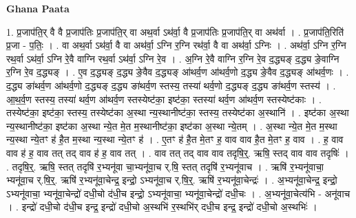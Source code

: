 \documentclass[17pt]{extarticle}
\begin{document}
\textbf{Ghana Paata } \newline

1. प्र॒जाप॑ति॒र् वै वै प्र॒जाप॑तिः प्र॒जाप॑ति॒र् वा अथ॒र्वा ऽथ॑र्वा॒ वै प्र॒जाप॑तिः प्र॒जाप॑ति॒र् वा अथ॑र्वा । . प्र॒जाप॑ति॒रिति॑ प्र॒जा - प॒तिः॒ । . वा अथ॒र्वा ऽथ॑र्वा॒ वै वा अथ॑र्वा॒ ऽग्नि र॒ग्नि रथ॑र्वा॒ वै वा अथ॑र्वा॒ ऽग्निः । . अथ॑र्वा॒ ऽग्नि र॒ग्नि रथ॒र्वा ऽथ॑र्वा॒ ऽग्नि रे॒वै वाग्नि रथ॒र्वा ऽथ॑र्वा॒ ऽग्नि रे॒व । . अ॒ग्नि रे॒वै वाग्नि र॒ग्नि रे॒व द॒द्ध्यङ् द॒द्ध्य ङे॒वाग्नि र॒ग्नि रे॒व द॒द्ध्यङ् । . ए॒व द॒द्ध्यङ् द॒द्ध्य ङे॒वैव द॒द्ध्यङ् आ॑थर्व॒ण आ॑थर्व॒णो द॒द्ध्य ङे॒वैव द॒द्ध्यङ् आ॑थर्व॒णः । . द॒द्ध्य ङा॑थर्व॒ण आ॑थर्व॒णो द॒द्ध्यङ् द॒द्ध्य ङा॑थर्व॒ण स्तस्य॒ तस्या॑ थर्व॒णो 
द॒द्ध्यङ् द॒द्ध्य ङा॑थर्व॒ण स्तस्य॑ । . आ॒थ॒र्व॒ण स्तस्य॒ तस्या॑ थर्व॒ण आ॑थर्व॒ण स्तस्येष्ट॑का॒ इष्ट॑का॒ स्तस्या॑ थर्व॒ण आ॑थर्व॒ण 
स्तस्येष्ट॑काः । . तस्येष्ट॑का॒ इष्ट॑का॒ स्तस्य॒ तस्येष्ट॑का अ॒स्था न्य॒स्थानीष्ट॑का॒ स्तस्य॒ तस्येष्ट॑का अ॒स्थानि॑ । . इष्ट॑का अ॒स्था न्य॒स्थानीष्ट॑का॒ इष्ट॑का अ॒स्था न्ये॒त मे॒त म॒स्थानीष्ट॑का॒ इष्ट॑का अ॒स्था न्ये॒तम् । . अ॒स्था न्ये॒त मे॒त म॒स्था न्य॒स्था न्ये॒तꣳ ह॑ है॒त म॒स्था न्य॒स्था न्ये॒तꣳ ह॑ । . ए॒तꣳ ह॑ है॒त मे॒तꣳ ह॒ वाव वाव है॒त मे॒तꣳ ह॒ वाव । . ह॒ वाव वाव ह॑ ह॒ वाव तत् तद् वाव ह॑ ह॒ वाव तत् । . वाव तत् तद् वाव वाव तदृषि॒र्॒. ऋषि॒ स्तद् वाव वाव तदृषिः॑ । . तदृषि॒र्॒. ऋषि॒ स्तत् तदृषि॑ र॒भ्यनू॑वा चा॒भ्यनू॑वा॒च र्.षि॒ स्तत् तदृषि॑ र॒भ्यनू॑वाच । . ऋषि॑ र॒भ्यनू॑वाचा॒ भ्यनू॑वा॒च र्.षि॒र्॒. ऋषि॑ र॒भ्यनू॑वा॒चेन्द्र॒ इन्द्रो॒ ऽभ्यनू॑वा॒च र्.षि॒र्॒. ऋषि॑ र॒भ्यनू॑वा॒चेन्द्रः॑ । . अ॒भ्यनू॑वा॒चेन्द्र॒ इन्द्रो॒ ऽभ्यनू॑वाचा॒ भ्यनू॑वा॒चेन्द्रो॑ दधी॒चो द॑धी॒च इन्द्रो॒ ऽभ्यनू॑वाचा॒ 
भ्यनू॑वा॒चेन्द्रो॑ दधी॒चः । . अ॒भ्यनू॑वा॒चेत्य॑भि - अनू॑वाच । . इन्द्रो॑ दधी॒चो द॑धी॒च इन्द्र॒ इन्द्रो॑ दधी॒चो अ॒स्थभि॑ र॒स्थभि॑र् दधी॒च इन्द्र॒ इन्द्रो॑ दधी॒चो अ॒स्थभिः॑ । \newline
\end{document}
